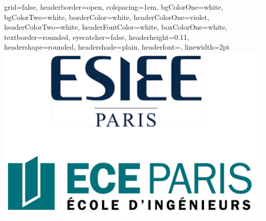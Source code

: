 \documentclass[a0paper,portrait]{baposter}
\begin{document}

\begin{poster}{
    grid=false,
    headerborder=open,           %
    colspacing=1em,              %
    bgColorOne=white,            %
    bgColorTwo=white,            %
    borderColor=white,       %
    headerColorOne=violet,   %
    headerColorTwo=white,   %
    headerFontColor=white,       %
    boxColorOne=white,           %
    textborder=rounded,          %
    eyecatcher=false,            %
    headerheight=0.11\textheight,%
    headershape=rounded,         %
    headershade=plain,
    headerfont=\Large\textsf,    %
    linewidth=2pt                %
}{
    \includegraphics[scale=.3]{esiee}
}
\end{poster}
\end{document}
